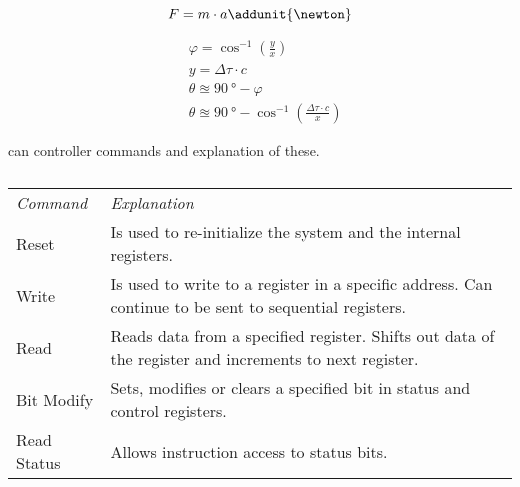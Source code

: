 \begin{equation}
F = m \cdot a \addunit{\newton}
\end{equation}
\startexplain
\stopexplain

\begin{subequations} \label{eq:tech_ToA}
	\begin{flalign}
		&\varphi = \cos^{-1} \left( \frac{y}{x} \right) \\
		&y = \Delta \tau \cdot c \\
		&\theta \approxeq \SI{90}{\degree} - \varphi \\
		&\theta \approxeq \SI{90}{\degree} - \cos^{-1} \left( \frac{ \Delta\tau \cdot c}{x} \right)
	\end{flalign}
\end{subequations}







\begin{table}[h]
	\centering
	\caption{\gls{can} controller commands and explanation of these.}
	
	\begin{tabularx}{\textwidth}{lX}
		\textit{Command}		&	\textit{Explanation} \\ \rowcolor{lightGrey} \toprule
		Reset					&	Is used to re-initialize the system and the internal registers.\\
		Write					&	Is used to write to a register in a specific address. Can continue to be sent to sequential registers.\\ \rowcolor{lightGrey}
		Read					&	Reads data from a specified register. Shifts out data of the register and increments to next register.\\
		Bit Modify				&	Sets, modifies or clears a specified bit in status and control registers.\\ \rowcolor{lightGrey}
		Read Status				&	Allows instruction access to status bits.\\
	\end{tabularx}
	\caption*{\citep{MCP2510}}
\end{table}\label{tab:mcp_cmd_expl}





